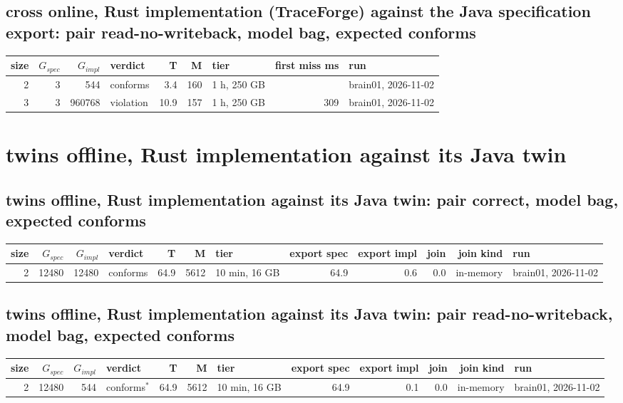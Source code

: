 \documentclass[10pt]{article}
\begin{document}
\subsection*{cross online, Rust implementation (TraceForge) against the Java specification export: pair \textsf{read-no-writeback}, model bag, expected conforms}
\begin{longtable}{@{}rrrlrrlrl@{}}
\toprule
size & $G_{\mathit{spec}}$ & $G_{\mathit{impl}}$ & verdict & T & M & tier & first miss ms & run \\
\midrule
\endhead
\color{red} 2 & 3 & 544 & conforms & 3.4 & 160 & 1 h, 250 GB &  & brain01, 2026-11-02 \\
\color{red} 3 & 3 & 960768 & violation & 10.9 & 157 & 1 h, 250 GB & 309 & brain01, 2026-11-02 \\
\bottomrule
\end{longtable}
\section*{twins offline, Rust implementation against its Java twin}
\subsection*{twins offline, Rust implementation against its Java twin: pair \textsf{correct}, model bag, expected conforms}
\begin{longtable}{@{}rrrlrrlrrrrl@{}}
\toprule
size & $G_{\mathit{spec}}$ & $G_{\mathit{impl}}$ & verdict & T & M & tier & export spec & export impl & join & join kind & run \\
\midrule
\endhead
\color{red} 2 & 12480 & 12480 & conforms & 64.9 & 5612 & 10 min, 16 GB & 64.9 & 0.6 & 0.0 & in-memory & brain01, 2026-11-02 \\
\bottomrule
\end{longtable}
\subsection*{twins offline, Rust implementation against its Java twin: pair \textsf{read-no-writeback}, model bag, expected conforms}
\begin{longtable}{@{}rrrlrrlrrrrl@{}}
\toprule
size & $G_{\mathit{spec}}$ & $G_{\mathit{impl}}$ & verdict & T & M & tier & export spec & export impl & join & join kind & run \\
\midrule
\endhead
\color{red} 2 & 12480 & 544 & conforms$^{\ast}$ & 64.9 & 5612 & 10 min, 16 GB & 64.9 & 0.1 & 0.0 & in-memory & brain01, 2026-11-02 \\
\bottomrule
\end{longtable}
\end{document}
